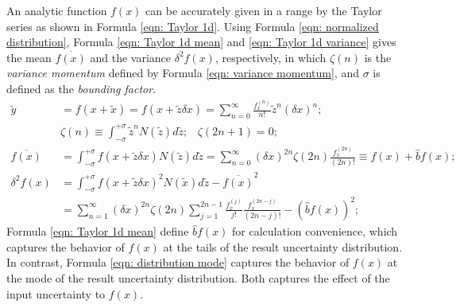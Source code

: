 \documentclass[twoside]{article}
\numberwithin{equation}{section}
\newcommand{\eqspace}{\;\;\;}
\begin{document}
An analytic function $f(x)$ can be accurately given in a range by the Taylor series as shown in Formula \eqref{eqn: Taylor 1d}.
Using Formula \eqref{eqn: normalized distribution}, Formula \eqref{eqn: Taylor 1d mean} and \eqref{eqn: Taylor 1d variance} gives the mean $\overline{f(x)}$ and the variance $\delta^2 f(x)$, respectively, in which $\zeta(n)$ is the \emph{variance momentum} defined by Formula \eqref{eqn: variance momentum}, and $\sigma$ is defined as the \emph{bounding factor}.
\begin{align}
\label{eqn: Taylor 1d} 
\tilde{y} &= f(x + \tilde{x}) = f(x + \tilde{z} \delta x) = \sum_{n=0}^{\infty} \frac{f^{(n)}_x}{n!} \tilde{z}^n (\delta x)^n; \\
\label{eqn: variance momentum}
& \zeta(n) \equiv \int_{-\sigma}^{+\sigma} \tilde{z}^n N(\tilde{z}) d \tilde{z};\eqspace \zeta(2n+1) = 0; \\
\label{eqn: Taylor 1d mean}
\overline{f(x)} &= \int_{-\sigma}^{+\sigma} f(x + \tilde{z} \delta x) N(\tilde{z}) d \tilde{z}
  = \sum_{n=0}^{\infty}(\delta x)^{2n} \zeta(2n) \frac{f^{(2n)}_x}{(2n)!} \equiv f(x) + \hat{b} f(x); \\
\label{eqn: Taylor 1d variance}
\delta^2 f(x) &= \int_{-\sigma}^{+\sigma} f(x + \tilde{z} \delta x)^2 N(\tilde{x}) d \tilde{z} - \overline{f(x)}^2 \nonumber \\
 &= \sum_{n=1}^{\infty} (\delta x)^{2n} \zeta(2n) \sum_{j=1}^{2n-1} \frac{f^{(j)}_x}{j!} \frac{f^{(2n-j)}_x}{(2n-j)!} - \left( \hat{b} f(x) \right)^2; 
\end{align}
Formula \eqref{eqn: Taylor 1d mean} define $\hat{b} f(x)$ for calculation convenience, which captures the behavior of $f(x)$ at the tails of the result uncertainty distribution.
In contrast, Formula \eqref{eqn: distribution mode} captures the behavior of $f(x)$ at the mode of the result uncertainty distribution.
Both captures the effect of the input uncertainty to $f(x)$.
\end{document}
